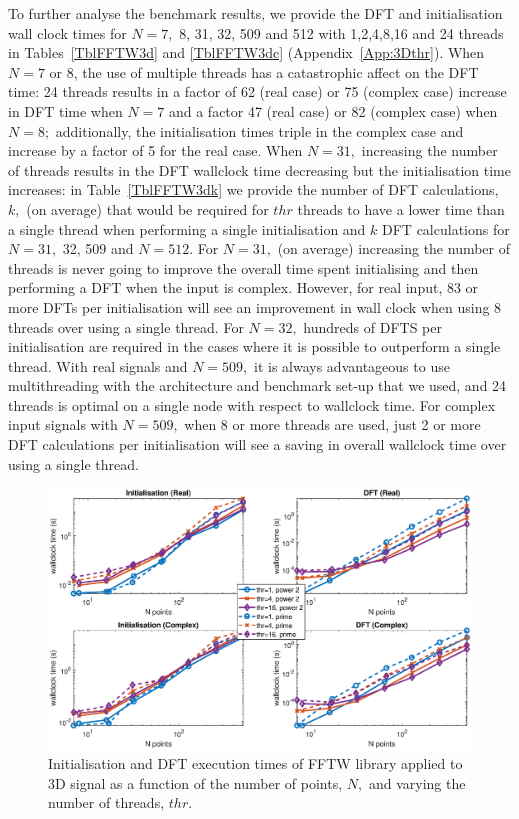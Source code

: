 \documentclass[a4paper]{article}
\begin{document}
To further analyse the benchmark results, we provide the DFT and
initialisation wall clock times for $N=7,$ 8, 31, 32, 509 and 512 with
1,2,4,8,16 and 24 threads in Tables~\ref{TblFFTW3d} and
\ref{TblFFTW3dc} (Appendix~\ref{App:3Dthr}). When $N=7$ or 8, the use of multiple threads has a
catastrophic affect on the DFT time: 24 threads results in a factor of
62 (real case) or 75 (complex case) increase in DFT time when $N=7$
and a factor 47 (real case) or 82 (complex case) when $N=8;$
additionally, the initialisation times triple in the complex case and
increase by a factor of 5 for the real case. When $N=31,$ increasing
the number of threads results in the DFT wallclock time decreasing but
the initialisation time increases: in Table~\ref{TblFFTW3dk} we
provide the number of DFT calculations, $k,$ (on average) that would
be required for $thr$ threads to have a lower time than a single
thread when performing a single initialisation and $k$ DFT
calculations for $N=31,$ 32, 509 and $N=512.$ For $N=31,$ (on average)
increasing the number of threads is never going to improve the overall
time spent initialising and then performing a DFT when the input is
complex. However, for real input, 83 or more DFTs per initialisation
will see an improvement in wall clock when using 8 threads over using
a single thread. For $N=32,$ hundreds of DFTS per initialisation are
required in the cases where it is possible to outperform a single
thread. With real signals and $N=509,$ it is always advantageous to
use multithreading with the architecture and benchmark set-up that we
used, and 24 threads is optimal on a single node with respect to
wallclock time. For complex input signals with $N=509,$ when 8 or more
threads are used, just 2 or more DFT calculations per initialisation
will see a saving in overall wallclock time over using a single
thread.

\begin{figure}[htb]
    \centering
    \includegraphics[width=0.9\linewidth]{../results/fftw_3d_thr.eps}
  \caption{Initialisation and DFT execution times of FFTW library applied to 3D signal as a function of the
    number of points, $N,$ and varying the number of threads, $thr.$ }
  \label{3DFFTW}
\end{figure}
\end{document}
